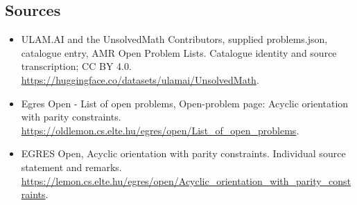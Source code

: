 \documentclass[11pt,a4paper]{article}
\begin{document}
\subsection{Sources}
\begin{itemize}
\item[S1] ULAM.AI and the UnsolvedMath Contributors, supplied problems.json, catalogue entry, AMR Open Problem Lists. Catalogue identity and source transcription; CC BY 4.0.
\url{https://huggingface.co/datasets/ulamai/UnsolvedMath}.
\item[S2] Egres Open - List of open problems, Open-problem page: Acyclic orientation with parity constraints. 
\url{https://oldlemon.cs.elte.hu/egres/open/List_of_open_problems}.
\item[S3] EGRES Open, Acyclic orientation with parity constraints. Individual source statement and remarks.
\url{https://lemon.cs.elte.hu/egres/open/Acyclic_orientation_with_parity_constraints}.
\end{itemize}
\end{document}
